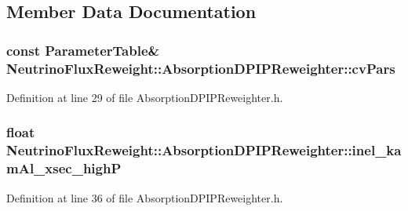 \subsection{Member Data Documentation}
\hypertarget{class_neutrino_flux_reweight_1_1_absorption_d_p_i_p_reweighter_ab830029670dfde65be3fc9a0bc40cd49}{
\subsubsection[{cv\-Pars}]{\setlength{\rightskip}{0pt plus 5cm}const {\bf Parameter\-Table}\& Neutrino\-Flux\-Reweight\-::\-Absorption\-D\-P\-I\-P\-Reweighter\-::cv\-Pars}}\label{class_neutrino_flux_reweight_1_1_absorption_d_p_i_p_reweighter_ab830029670dfde65be3fc9a0bc40cd49}


Definition at line 29 of file Absorption\-D\-P\-I\-P\-Reweighter.\-h.

\hypertarget{class_neutrino_flux_reweight_1_1_absorption_d_p_i_p_reweighter_a97ba47996c1cae70e4374d8856fdb4cd}{
\subsubsection[{inel\-\_\-kam\-Al\-\_\-xsec\-\_\-high\-P}]{\setlength{\rightskip}{0pt plus 5cm}float Neutrino\-Flux\-Reweight\-::\-Absorption\-D\-P\-I\-P\-Reweighter\-::inel\-\_\-kam\-Al\-\_\-xsec\-\_\-high\-P\hspace{0.3cm}{\ttfamily [private]}}}\label{class_neutrino_flux_reweight_1_1_absorption_d_p_i_p_reweighter_a97ba47996c1cae70e4374d8856fdb4cd}


Definition at line 36 of file Absorption\-D\-P\-I\-P\-Reweighter.\-h.

